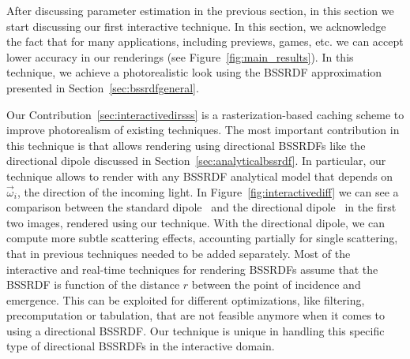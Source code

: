 %
After discussing parameter estimation in the previous section, in this section we start discussing our first interactive technique. In this section, we acknowledge the fact that for many applications, including previews, games, etc. we can accept lower accuracy in our renderings (see Figure~\ref{fig:main_results}). In this technique, we achieve a photorealistic look using the BSSRDF approximation presented in Section~\ref{sec:bssrdfgeneral}.

Our Contribution~\ref{sec:interactivedirsss} is a rasterization-based caching scheme to improve photorealism of existing techniques. The most important contribution in this technique is that allows rendering using directional BSSRDFs like the directional dipole discussed in Section~\ref{sec:analyticalbssrdf}. In particular, our technique allows to render with any BSSRDF analytical model that depends on $\vec{\omega}_i$, the direction of the incoming light. In Figure~\ref{fig:interactivediff} we can see a comparison between the standard dipole~\cite{Jensen2001} and the directional dipole~\cite{Frisvad2014} in the first two images, rendered using our technique. With the directional dipole, we can compute more subtle scattering effects, accounting partially for single scattering, that in previous techniques needed to be added separately. Most of the interactive and real-time techniques for rendering BSSRDFs assume that the BSSRDF is function of the distance $r$ between the point of incidence and emergence. This can be exploited for different optimizations, like filtering, precomputation or tabulation, that are not feasible anymore when it comes to using a directional BSSRDF. Our technique is unique in handling this specific type of directional BSSRDFs in the interactive domain. 

